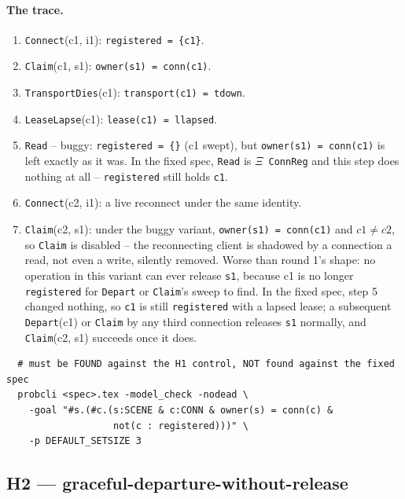 \documentclass[a4paper,10pt,fleqn]{article}
\begin{document}
\paragraph{The trace.}
\begin{enumerate}
  \item \texttt{Connect}(c1, i1): \texttt{registered = \{c1\}}.
  \item \texttt{Claim}(c1, s1): \texttt{owner(s1) = conn(c1)}.
  \item \texttt{TransportDies}(c1): \texttt{transport(c1) = tdown}.
  \item \texttt{LeaseLapse}(c1): \texttt{lease(c1) = llapsed}.
  \item \texttt{Read} -- buggy: \texttt{registered = \{\}} (c1 swept), but
    \texttt{owner(s1) = conn(c1)} is left exactly as it was. In the fixed
    spec, \texttt{Read} is \texttt{$\Xi$ ConnReg} and this step does
    nothing at all -- \texttt{registered} still holds \texttt{c1}.
  \item \texttt{Connect}(c2, i1): a live reconnect under the same
    identity.
  \item \texttt{Claim}(c2, s1): under the buggy variant,
    \texttt{owner(s1) = conn(c1)} and \texttt{$c1 \neq c2$}, so
    \texttt{Claim} is disabled -- the reconnecting client is shadowed by
    a connection a read, not even a write, silently removed. Worse than
    round 1's shape: no operation in this variant can ever release
    \texttt{s1}, because c1 is no longer \texttt{registered} for
    \texttt{Depart} or \texttt{Claim}'s sweep to find. In the fixed spec,
    step 5 changed nothing, so \texttt{c1} is still \texttt{registered}
    with a lapsed lease; a subsequent \texttt{Depart}(c1) or \texttt{Claim}
    by any third connection releases \texttt{s1} normally, and
    \texttt{Claim}(c2, s1) succeeds once it does.
\end{enumerate}

\begin{verbatim}
  # must be FOUND against the H1 control, NOT found against the fixed spec
  probcli <spec>.tex -model_check -nodead \
    -goal "#s.(#c.(s:SCENE & c:CONN & owner(s) = conn(c) &
                   not(c : registered)))" \
    -p DEFAULT_SETSIZE 3
\end{verbatim}

\subsection{H2 --- graceful-departure-without-release}
\label{sec:fidelity-h2}
\end{document}
